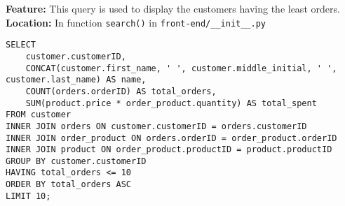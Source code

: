 \textbf{Feature:} This query is used to display the customers having the least orders. \\
\textbf{Location:} In function \texttt{search()} in \texttt{front-end/\_\_init\_\_.py}

\begin{lstlisting}
SELECT
    customer.customerID,
    CONCAT(customer.first_name, ' ', customer.middle_initial, ' ', customer.last_name) AS name,
    COUNT(orders.orderID) AS total_orders,
    SUM(product.price * order_product.quantity) AS total_spent
FROM customer
INNER JOIN orders ON customer.customerID = orders.customerID
INNER JOIN order_product ON orders.orderID = order_product.orderID
INNER JOIN product ON order_product.productID = product.productID
GROUP BY customer.customerID
HAVING total_orders <= 10
ORDER BY total_orders ASC
LIMIT 10;
\end{lstlisting}